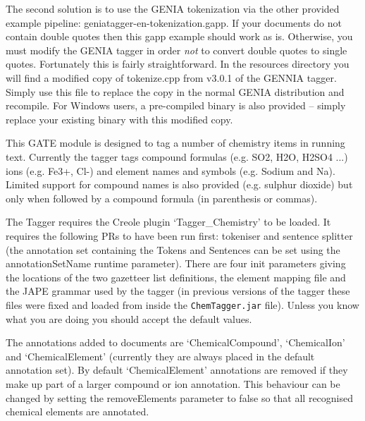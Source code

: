 The second solution is to use the GENIA tokenization via the other provided
example pipeline: geniatagger-en-tokenization.gapp. If your documents do not
contain double quotes then this gapp example should work as is. Otherwise,
you must modify the GENIA tagger in order \textit{not} to convert double quotes
to single quotes. Fortunately this is fairly straightforward. In the
resources directory you will find a modified copy of tokenize.cpp from
v3.0.1 of the GENNIA tagger. Simply use this file to replace the copy in the
normal GENIA distribution and recompile. For Windows users, a pre-compiled
binary is also provided -- simply replace your existing binary with this
modified copy.


This GATE module is designed to tag a number of chemistry items in
running text. Currently the tagger tags compound formulas (e.g.
SO2, H2O, H2SO4 ...) ions (e.g. Fe3+, Cl-) and element names
and symbols (e.g. Sodium and Na). Limited support for compound names
is also provided (e.g. sulphur dioxide) but only when followed by
a compound formula (in parenthesis or commas).


The Tagger requires the Creole plugin `Tagger\_Chemistry' to be
loaded.  It requires the following PRs to have been run first:
tokeniser and sentence splitter (the annotation set containing the
Tokens and Sentences can be set using the annotationSetName runtime
parameter).  There are four init parameters giving the locations of 
the two gazetteer list definitions, the element mapping file and the
JAPE grammar used by the tagger (in previous versions of the tagger
these files were fixed and loaded from inside the {\tt ChemTagger.jar}
file).  Unless you know what you are doing you should accept the default
values.

The annotations added to documents are `ChemicalCompound', `ChemicalIon'
and `ChemicalElement' (currently they are always placed in the default
annotation set). By default `ChemicalElement' annotations are removed if they
make up part of a larger compound or ion annotation. This behaviour can be
changed by setting the removeElements parameter to false so that all recognised
chemical elements are annotated.


